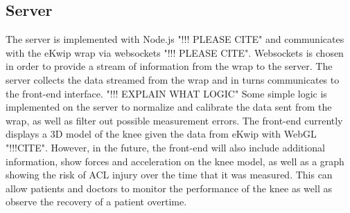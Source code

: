 \subsection {Server}
The server is implemented with Node.js "!!! PLEASE CITE" and communicates with the eKwip wrap via websockets "!!! PLEASE CITE". Websockets is chosen in order to provide a stream of information from the wrap to the server. The server collects the data streamed from the wrap and in turns communicates to the front-end interface. "!!! EXPLAIN WHAT LOGIC" Some simple logic is implemented on the server to normalize and calibrate the data sent from the wrap, as well as filter out possible measurement errors. The front-end currently displays a 3D model of the knee given the data from eKwip with WebGL "!!!CITE". However, in the future, the front-end will also include additional information, show forces and acceleration on the knee model, as well as a graph showing the risk of ACL injury over the time that it was measured. This can allow patients and doctors to monitor the performance of the knee as well as observe the recovery of a patient overtime.
